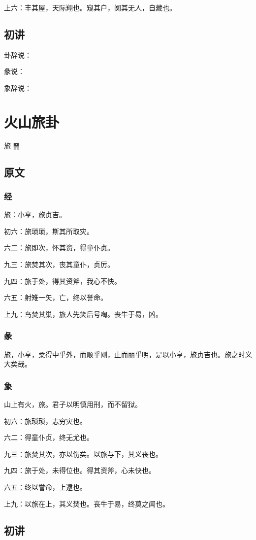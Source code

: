 \documentclass[12pt,oneside]{book}
\begin{document}
上六：丰其屋，天际翔也。窥其户，阒其无人，自藏也。

\section{初讲}
卦辞说：

彖说：

象辞说：

\chapter{火山旅卦}
旅 {\Large ䷷}


\section{原文}

\subsection{经}
旅：小亨，旅贞吉。

初六：旅琐琐，斯其所取灾。

六二：旅即次，怀其资，得童仆贞。

九三：旅焚其次，丧其童仆，贞厉。

九四：旅于处，得其资斧，我心不快。

六五：射雉一矢，亡，终以誉命。

上九：鸟焚其巢，旅人先笑后号啕。丧牛于易，凶。

\subsection{彖}
旅，小亨，柔得中乎外，而顺乎刚，止而丽乎明，是以小亨，旅贞吉也。旅之时义大矣哉。

\subsection{象}
山上有火，旅。君子以明慎用刑，而不留狱。

初六：旅琐琐，志穷灾也。

六二：得童仆贞，终无尤也。

九三：旅焚其次，亦以伤矣。以旅与下，其义丧也。

九四：旅于处，未得位也。得其资斧，心未快也。

六五：终以誉命，上逮也。

上九：以旅在上，其义焚也。丧牛于易，终莫之闻也。

\section{初讲}
\end{document}
